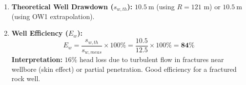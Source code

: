 \documentclass[11pt]{article}
\begin{document}
\begin{exoresolu}
\begin{enumerate}
    Now $R = 3000 \times 10.46 \times \sqrt{1.48 \times 10^{-5}} = 31380 \times 0.00385 = \mathbf{121\ \mathrm{m}}$.
    (Check: $s_w = \frac{Q}{2\pi T} \ln(R/r_w) = 1.492 \times \ln(121/0.15) = 1.492 \times 6.69 = 9.98\ \mathrm{m}$. Close enough).
    \item \textbf{Theoretical Well Drawdown ($s_{w,th}$):} $\mathbf{10.5\ \mathrm{m}}$ (using $R=121$ m) or $\mathbf{10.5\ \mathrm{m}}$ (using OW1 extrapolation).
    \item \textbf{Well Efficiency ($E_w$):}
    \[ E_w = \frac{s_{w,th}}{s_{w,meas}} \times 100\% = \frac{10.5}{12.5} \times 100\% = \mathbf{84\%} \]
    \textbf{Interpretation:} $16\%$ head loss due to turbulent flow in fractures near wellbore (skin effect) or partial penetration. Good efficiency for a fractured rock well.
\end{enumerate}
\end{exoresolu}
\end{document}
